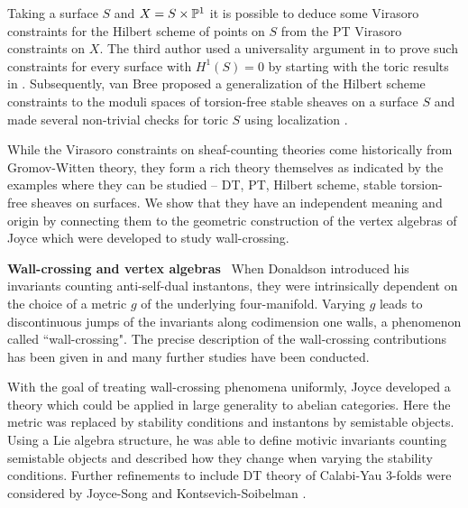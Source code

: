\documentclass[a4paper, 12pt]{amsart}
\begin{document}
Taking a surface $S$ and $X=S\times \mathbb{P}^1$ it is possible to deduce some Virasoro constraints for the Hilbert scheme of points on $S$ from the PT Virasoro constraints on $X$. The third author used a universality argument in \cite{moreira} to prove such constraints for every surface with $H^1(S)=0$ by starting with the toric results in \cite{moop}. Subsequently, van Bree proposed a generalization of the Hilbert scheme constraints to the moduli spaces of torsion-free stable sheaves on a surface $S$ and made several non-trivial checks for toric $S$ using localization \cite{bree}.


While the Virasoro constraints on sheaf-counting theories come historically from Gromov-Witten theory, they form a rich theory themselves as indicated by the examples where they can be studied -- DT, PT, Hilbert scheme, stable torsion-free sheaves on surfaces. We show that they have an independent meaning and origin by connecting them to the geometric construction of the vertex algebras of Joyce \cite{Jo17} which were developed to study wall-crossing.



\noindent\textbf{Wall-crossing and vertex algebras} \
When Donaldson \cite{Do83} introduced his invariants counting anti-self-dual instantons, they were intrinsically dependent on the choice of a metric $g$ of the underlying four-manifold. Varying $g$ leads to discontinuous jumps of the invariants along codimension one walls, a phenomenon called ``wall-crossing". The precise description of the wall-crossing contributions has been given in \cite{KoMo94} and many further studies have been conducted.



With the goal of treating wall-crossing phenomena uniformly, Joyce \cite{JO06I, JO06II, JO06III, JO06IV} developed a theory which could be applied in large generality to abelian categories. Here the metric was replaced by stability conditions and instantons by semistable objects. Using a Lie algebra structure, he was able to define motivic invariants counting semistable objects and described how they change when varying the stability conditions. Further refinements to include DT theory of Calabi-Yau 3-folds were considered by Joyce-Song \cite{JS12} and Kontsevich-Soibelman \cite{KS08}.
\end{document}
